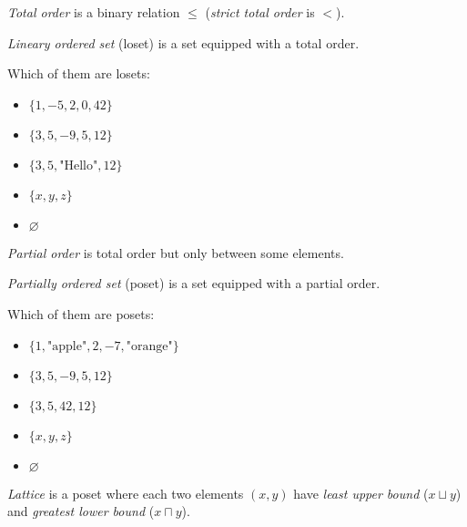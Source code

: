 \documentclass{article}
\begin{document}
\emph{Total order} is a binary relation \(\leq\) (\emph{strict total order} is \(<\)).

\emph{Lineary ordered set} (loset) is a set equipped with a total order.

Which of them are losets:

\begin{itemize}[label={}]
\item \(\{ 1, -5, 2, 0, 42 \}\)
\item \(\{ 3, 5, -9, 5, 12 \}\)
\item \(\{ 3, 5, \text{"Hello"}, 12 \}\)
\item \(\{ x, y, z \}\)
\item \(\varnothing\)
\end{itemize}

\plush{}


\emph{Partial order} is total order but only between some elements.

\emph{Partially ordered set} (poset) is a set equipped with a partial order.

Which of them are posets:

\begin{itemize}[label={}]
\item \(\{ 1, \text{"apple"}, 2, -7, \text{"orange"} \}\)
\item \(\{ 3, 5, -9, 5, 12 \}\)
\item \(\{ 3, 5, 42, 12 \}\)
\item \(\{ x, y, z \}\)
\item \(\varnothing\)
\end{itemize}

\plush{}


\emph{Lattice} is a poset where each two elements \((x, y)\) have \emph{least upper bound} (\(x \sqcup y\)) and
\emph{greatest lower bound} (\(x \sqcap y\)).
\end{document}
